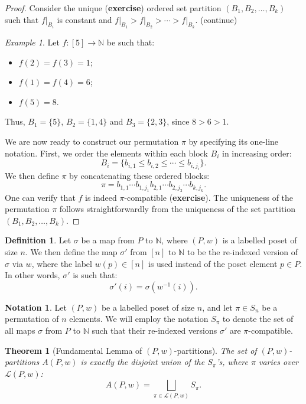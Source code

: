 \documentclass[11pt]{amsart}
\theoremstyle{plain}
\newtheorem{theorem}{Theorem}[section]
\theoremstyle{definition}
\newtheorem{definition}{Definition}
\newtheorem*{notation}{Notation}
\theoremstyle{remark}
\newtheorem{example}{Example}[section]
\newcommand{\LL}{\mathcal{L}}
\newcommand{\NN}{\mathbb{N}}
\numberwithin{equation}{section}
\begin{document}
\begin{proof}
	Consider the unique (\textbf{exercise}) ordered set partition $(B_1, B_2, \ldots, B_k)$ such that
	$f \big|_{B_i}$ is constant and $f \big|_{B_1} > f \big|_{B_2} > \cdots > f \big|_{B_k}$. (continue)
	\begin{example}
		Let $f : [5] \to \NN$ be such that:

		\begin{itemize}
			\item $f(2) = f(3) = 1$;
			\item $f(1) = f(4) = 6$;
			\item $f(5) = 8$.
		\end{itemize}

		Thus, $B_1 = \{5\}$, $B_2 = \{1, 4\}$ and $B_3 = \{2, 3\}$, since $8 > 6 > 1$.
	\end{example}

	We are now ready to construct our permutation $\pi$ by specifying its one-line notation.
	First, we order the elements within each block $B_i$ in increasing order:
	\[
		B_i = \{ b_{i,1} \leq b_{i,2} \leq \cdots \leq b_{i, j_i} \}.
	\]
	We then define $\pi$ by concatenating these ordered blocks:
	\[
		\pi = b_{1,1} \cdots b_{1, j_1} b_{2,1} \cdots b_{2, j_2} \cdots b_{k, j_k}.
	\]
	One can verify that $f$ is indeed $\pi$-compatible (\textbf{exercise}). The uniqueness of the permutation
	$\pi$ follows straightforwardly from the uniqueness of the set partition $(B_1, B_2, \ldots, B_k)$.
\end{proof}

\begin{definition}
	Let $\sigma$ be a map from $P$ to $\NN$, where $(P, w)$ is a labelled poset of size $n$. We then define
	the map $\sigma'$ from $[n]$ to $\NN$ to be the re-indexed version of $\sigma$ via $w$, where the label $w(p) \in [n]$
	is used instead of the poset element $p \in P$. In other words, $\sigma'$ is such that:
	\[
		\sigma'(i) = \sigma(w^{-1}(i)).
	\]
\end{definition}

\begin{notation}
	Let $(P, w)$ be a labelled poset of size $n$, and let $\pi \in S_n$ be a permutation of $n$ elements. We will employ the notation $S_\pi$
	to denote the set of all maps $\sigma$ from $P$ to $\NN$ such that their re-indexed versions $\sigma'$ are $\pi$-compatible.
\end{notation}

\begin{theorem}[Fundamental Lemma of $(P, w)$-partitions]
	The set of $(P, w)$-partitions $A(P, w)$ is exactly the disjoint union of the $S_\pi$'s, where $\pi$ varies over $\LL(P, w)$:
	\[
		A(P, w) = \bigsqcup_{\pi \in \LL(P, w)} S_\pi.
	\] \label{thm:fundamental_lemma}
\end{theorem}
\end{document}
